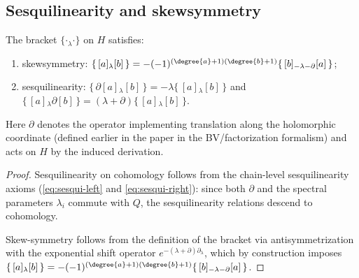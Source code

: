 \subsection{Sesquilinearity and skewsymmetry}

\begin{proposition}%
The bracket $\{\cdot {}_\lambda \cdot\}$ on $H$ satisfies:
\begin{enumerate}[label=(\alph*),leftmargin=2em]
 \item skewsymmetry: $\{\, [a] {}_\lambda [b] \,\} = - (-1)^{(\degree{a}+1)(\degree{b}+1)} \{\, [b] {}_{-\lambda-\partial} [a] \,\}$;
 \item sesquilinearity: $\{\,\partial [a] {}_\lambda [b] \,\} = -\lambda \{\, [a] {}_\lambda [b] \,\}$ and $\{\, [a] {}_\lambda \partial [b] \,\} = (\lambda+\partial)\{\, [a] {}_\lambda [b] \,\}$.
\end{enumerate}
Here $\partial$ denotes the operator implementing translation along the holomorphic coordinate (defined earlier in the paper in the BV/factorization formalism) and acts on $H$ by the induced derivation.
\end{proposition}
\begin{proof}
Sesquilinearity on cohomology follows from the chain-level sesquilinearity axioms (\eqref{eq:sesqui-left} and \eqref{eq:sesqui-right}): since both $\partial$ and the spectral parameters $\lambda_i$ commute with $Q$, the sesquilinearity relations descend to cohomology.

Skew-symmetry follows from the definition of the bracket via antisymmetrization with the exponential shift operator $e^{-(\lambda+\partial)\partial_\lambda}$, which by construction imposes $\{\, [a] {}_\lambda [b] \,\} = -(-1)^{(\degree{a}+1)(\degree{b}+1)}\{\, [b] {}_{-\lambda-\partial} [a] \,\}$.
\end{proof}
